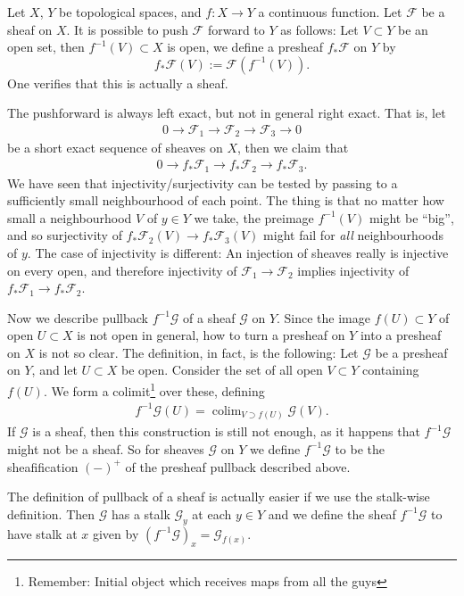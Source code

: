 \documentclass[12pt]{article}
\theoremstyle{plain}
\theoremstyle{definition}
\numberwithin{equation}{section}
\DeclareMathOperator*{\colim}{colim}
\newcommand{\CF}{\mathcal{F}}
\newcommand{\CG}{\mathcal{G}}
\begin{document}
Let $X$, $Y$ be topological spaces, and $f : X \rightarrow Y$ a continuous function. Let $\CF$ be a sheaf on $X$. It is possible to push $\CF$ forward to $Y$ as follows: Let $V \subset Y$ be an open set, then $f^{-1}(V) \subset X$ is open, we define a presheaf $f_* \CF$ on $Y$ by
\[
f_*\CF(V) := \CF(f^{-1}(V)).
\]
One verifies that this is actually a sheaf.

The pushforward is always left exact, but not in general right exact. That is, let
\begin{align*}
0 \rightarrow \CF_1 \rightarrow \CF_2 \rightarrow \CF_3 \rightarrow 0
\end{align*}
be a short exact sequence of sheaves on $X$, then we claim that
\begin{align*}
0 \rightarrow f_*\CF_1 \rightarrow f_*\CF_2 \rightarrow f_*\CF_3.
\end{align*}
We have seen that injectivity/surjectivity can be tested by passing to a sufficiently small neighbourhood of each point. The thing is that no matter how small a neighbourhood $V$ of $y \in Y$ we take, the preimage $f^{-1}(V)$ might be ``big'', and so surjectivity of $f_*\CF_2(V) \rightarrow f_*\CF_3(V)$ might fail for \emph{all} neighbourhoods of $y$. The case of injectivity is different: An injection of sheaves really is injective on every open, and therefore injectivity of $\CF_1 \rightarrow \CF_2$ implies injectivity of $f_*\CF_1 \rightarrow f_*\CF_2$.

Now we describe pullback $f^{-1}\CG$ of a sheaf $\CG$ on $Y$. Since the image $f(U) \subset Y$ of open $U \subset X$ is not open in general, how to turn a presheaf on $Y$ into a presheaf on $X$ is not so clear. The definition, in fact, is the following: Let $\CG$ be a presheaf on $Y$, and let $U \subset X$ be open. Consider the set of all open $V \subset Y$ containing $f(U)$. We form a colimit\footnote{Remember: Initial object which receives maps from all the guys} over these, defining
\begin{align}\label{eq:pullback.presheaf}
f^{-1}\CG(U) = \colim_{V \supset f(U)} \CG(V).
\end{align}
If $\CG$ is a sheaf, then this construction is still not enough, as it happens that $f^{-1}\CG$ might not be a sheaf. So for sheaves $\CG$ on $Y$ we define $f^{-1}\CG$ to be the sheafification $(-)^+$ of the presheaf pullback described above.

The definition of pullback of a sheaf is actually easier if we use the stalk-wise definition. Then $\CG$ has a stalk $\CG_y$ at each $y \in Y$ and we define the sheaf $f^{-1}\CG$ to have stalk at $x$ given by $(f^{-1}\CG)_{x} = \CG_{f(x)}$.
\end{document}

